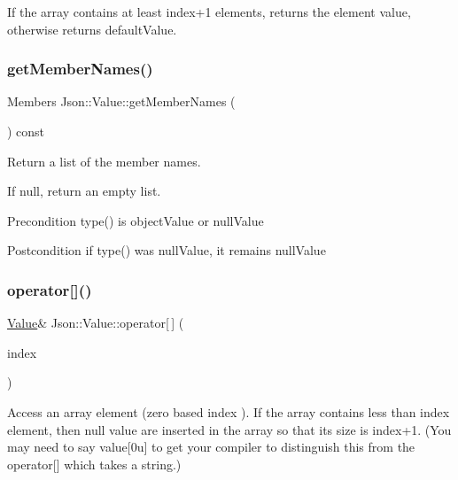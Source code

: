 If the array contains at least index+1 elements, returns the element value, otherwise returns default\+Value. \mbox{\label{class_json_1_1_value_a5fa4e5279e83a421f9c128dd78be652b}} 
\subsubsection{\texorpdfstring{getMemberNames()}{getMemberNames()}}
{\footnotesize\ttfamily Members Json\+::\+Value\+::get\+Member\+Names (\begin{DoxyParamCaption}{ }\end{DoxyParamCaption}) const}



Return a list of the member names. 

If null, return an empty list. \begin{DoxyPrecond}{Precondition}
type() is object\+Value or null\+Value 
\end{DoxyPrecond}
\begin{DoxyPostcond}{Postcondition}
if type() was null\+Value, it remains null\+Value 
\end{DoxyPostcond}
\mbox{\label{class_json_1_1_value_a9cca2c37d854443604b678f2236527ad}} 
\subsubsection{\texorpdfstring{operator[]()}{operator[]()}\hspace{0.1cm}{\footnotesize\ttfamily [1/7]}}
{\footnotesize\ttfamily \mbox{\hyperlink{class_json_1_1_value}{Value}}\& Json\+::\+Value\+::operator\mbox{[}$\,$\mbox{]} (\begin{DoxyParamCaption}\item[{Array\+Index}]{index }\end{DoxyParamCaption})}

Access an array element (zero based index ). If the array contains less than index element, then null value are inserted in the array so that its size is index+1. (You may need to say \textquotesingle{}value\mbox{[}0u\mbox{]}\textquotesingle{} to get your compiler to distinguish this from the operator\mbox{[}\mbox{]} which takes a string.) \mbox{\label{class_json_1_1_value_ad4b78dd032292ab1d91a3f89110b0d0e}} 
